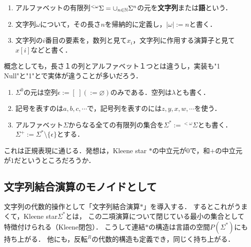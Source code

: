 \documentclass[uplatex, dvipdfmx]{jsreport}
\begin{document}
\begin{definition}\mbox{}
    \begin{enumerate}
        \item アルファベットの有限列${}^{<\omega}\Sigma=\cup_{n\in\mathbb{N}}\Sigma^n$の元を\textbf{文字列}または\textbf{語}という．
        \item 文字列$\omega$について，その長さ$n$を帰納的に定義し，$|\omega|:=n$と書く．
        \item 文字列の$i$番目の要素を，数列と見て$x_i$，文字列に作用する演算子と見て$x[i]$などと書く．
    \end{enumerate}
\end{definition}
\begin{remark}
    概念としても，長さ１の列とアルファベット１つとは違うし，実装も"1 Null"と"1"とで実体が違うことが多いだろう．
\end{remark}
\begin{notation}\mbox{}
    \begin{enumerate}
        \item $\Sigma^0$の元は空列$\epsilon:=[\;](:=\varnothing)$のみである．空列は$\lambda$とも書く．
        \item 記号を表すのは$a,b,c,\cdots$で，記号列を表すのには$z,y,x,w,\cdots$を使う．
        \item アルファベット$\Sigma$からなる全ての有限列の集合を$\Sigma^*:={}^{<\omega}\Sigma$とも書く．
        $\Sigma^+:=\Sigma^*\setminus\{\epsilon\}$とする．
    \end{enumerate}
    これは正規表現に通じる．発想は，Kleene star $*$の中立元が$0$で，和$+$の中立元が$1$だというところだろうか．
\end{notation}

\subsection{文字列結合演算のモノイドとして}

\begin{tcolorbox}[colframe=ForestGreen, colback=ForestGreen!10!white, breakable]
    文字列の代数的操作として「文字列結合演算$*$」を導入する．
    するとこれがうまくて，Kleene star$\Sigma^*$とは，
    この二項演算について閉じている最小の集合として特徴付けられる（Kleene閉包）．
    こうして連結$*$の構造は言語の空間$P(\Sigma^*)$にも持ち上がる．
    他にも，反転${}^R$の代数的構造も定義でき，同じく持ち上がる．
\end{tcolorbox}
\end{document}
